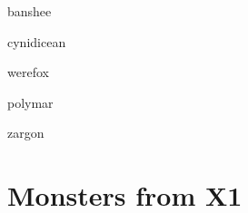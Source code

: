 \documentclass[letterpaper,serif]{module}
\begin{document}
\begin{newmonster}{banshee}\end{newmonster}
\begin{newmonster}{cynidicean}\end{newmonster}
\begin{newmonster}{werefox}\end{newmonster}
\begin{newmonster}{polymar}\end{newmonster}
\begin{newmonster}{zargon}\end{newmonster}

\part{Monsters from X1}
\end{document}
